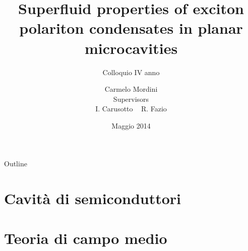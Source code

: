 \documentclass[10pt]{beamer}
\title{Superfluid properties of exciton polariton condensates in planar microcavities}
\subtitle{Colloquio IV anno}
\author[Carmelo Mordini]{Carmelo Mordini\\ \vspace{.7cm}
{\footnotesize Supervisors\\ \vspace{-.1cm}I. Carusotto ~ R. Fazio}}
\institute[SNS]
{
  Scuola Normale Superiore\\
  }
\date{Maggio 2014}
\begin{document}

\begin{frame}[plain]
\advance\textwidth2cm
\hsize\textwidth
\columnwidth\textwidth
  \titlepage
\end{frame}


\begin{frame}{Outline}
\transwipe[direction=270]
  \tableofcontents[pausesections]
\end{frame}

\section{Cavità di semiconduttori}



\section{Teoria di campo medio}
\end{document}

